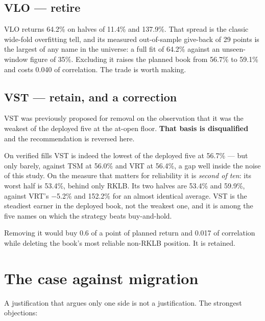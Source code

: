 \documentclass[11pt]{article}
\begin{document}
\subsection{VLO --- retire}

VLO returns 64.2\% on halves of 11.4\% and 137.9\%. That spread is the classic
wide-fold overfitting tell, and its measured out-of-sample give-back of 29 points is the largest
of any name in the universe: a full fit of 64.2\% against an unseen-window figure of 35\%.
Excluding it raises the planned book from 56.7\% to 59.1\% and costs 0.040 of correlation. The
trade is worth making.

\subsection{VST --- retain, and a correction}

VST was previously proposed for removal on the observation that it was the weakest of the
deployed five at the at-open floor. \textbf{That basis is disqualified} and the recommendation
is reversed here.

On verified fills VST is indeed the lowest of the deployed five at 56.7\% --- but only barely,
against TSM at 56.0\% and VRT at 56.4\%, a gap well inside the noise of this study. On the
measure that matters for reliability it is \emph{second of ten}: its worst half is 53.4\%,
behind only RKLB. Its two halves are 53.4\% and 59.9\%, against VRT's $-$5.2\% and 152.2\% for
an almost identical average. VST is the steadiest earner in the deployed book, not the weakest
one, and it is among the five names on which the strategy beats buy-and-hold.

Removing it would buy 0.6 of a point of planned return and 0.017 of correlation while deleting the
book's most reliable non-RKLB position. It is retained.

\section{The case against migration}

A justification that argues only one side is not a justification. The strongest objections:
\end{document}

